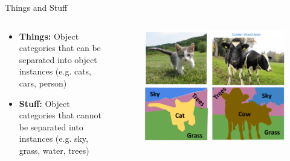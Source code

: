 \documentclass[10pt]{beamer}
\theoremstyle{remark}
\theoremstyle{definition}
\begin{document}
\begin{frame}{Things and Stuff}
\begin{columns}
    \begin{column}{0.5\textwidth}
        \begin{itemize}
            \item \textbf{Things:} Object categories that can be separated into object instances (e.g. cats, cars, person)
            \item \textbf{Stuff:} Object categories that cannot be separated into instances (e.g. sky, grass, water, trees)
        \end{itemize}
    \end{column}
    \begin{column}{0.5\textwidth}
        \begin{figure}
        \centering
        \includegraphics[width=1.0\textwidth,height=1.0\textheight,keepaspectratio]{./images/ins_1.png}
        \end{figure}
    \end{column}
\end{columns}
    
\end{frame}
\end{document}
